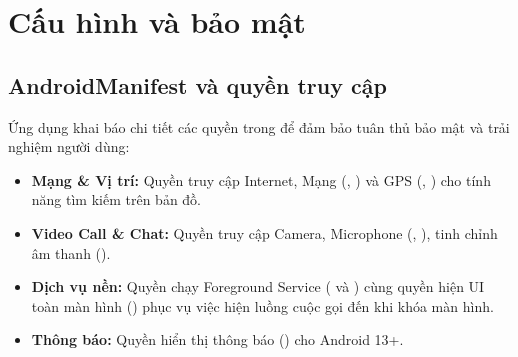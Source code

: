 \section{Cấu hình và bảo mật}

\subsection{AndroidManifest và quyền truy cập}
Ứng dụng khai báo chi tiết các quyền trong  để đảm bảo tuân thủ bảo mật và trải nghiệm người dùng:
\begin{itemize}
    \item \textbf{Mạng \& Vị trí:} Quyền truy cập Internet, Mạng (, ) và GPS (, ) cho tính năng tìm kiếm trên bản đồ.
    \item \textbf{Video Call \& Chat:} Quyền truy cập Camera, Microphone (, ), tinh chỉnh âm thanh ().
    \item \textbf{Dịch vụ nền:} Quyền chạy Foreground Service ( và ) cùng quyền hiện UI toàn màn hình () phục vụ việc hiện luồng cuộc gọi đến khi khóa màn hình.
    \item \textbf{Thông báo:} Quyền hiển thị thông báo () cho Android 13+.
\end{itemize}
